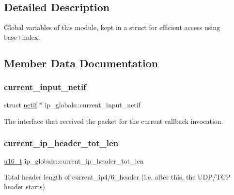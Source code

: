 \subsection{Detailed Description}
Global variables of this module, kept in a struct for efficient access using base+index. 

\subsection{Member Data Documentation}
\mbox{\label{structip__globals_a4099a6d61a3e05d25c573b978d82e4e0}} 
\subsubsection{\texorpdfstring{current\+\_\+input\+\_\+netif}{current\_input\_netif}}
{\footnotesize\ttfamily struct \hyperlink{structnetif}{netif} $\ast$ ip\+\_\+globals\+::current\+\_\+input\+\_\+netif}

The interface that received the packet for the current callback invocation. \mbox{\label{structip__globals_a17004526e6f1a164c0bab01aeac5e34a}} 
\subsubsection{\texorpdfstring{current\+\_\+ip\+\_\+header\+\_\+tot\+\_\+len}{current\_ip\_header\_tot\_len}}
{\footnotesize\ttfamily \hyperlink{group__compiler__abstraction_ga77570ac4fcab86864fa1916e55676da2}{u16\+\_\+t} ip\+\_\+globals\+::current\+\_\+ip\+\_\+header\+\_\+tot\+\_\+len}

Total header length of current\+\_\+ip4/6\+\_\+header (i.\+e. after this, the U\+D\+P/\+T\+CP header starts) \mbox{\label{structip__globals_a0b4e54250c692c638408de54593d2aa1}} 
